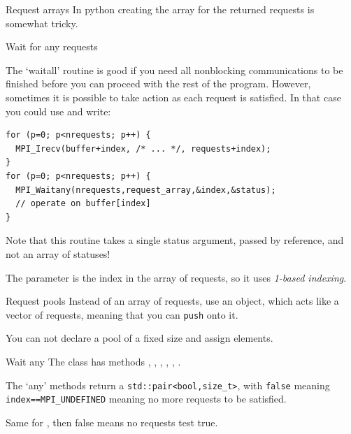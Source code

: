 \begin{pythonnote}{Request arrays}
  In python creating the array for the returned requests is somewhat
  tricky.
\end{pythonnote}

 {Wait for any requests}

The `waitall' routine is good if you need all nonblocking
communications to be finished before you can proceed with the rest of
the program. However, sometimes it is possible to take action as each
request is satisfied. In that case you could use
 and write:

\begin{lstlisting}
for (p=0; p<nrequests; p++) {
  MPI_Irecv(buffer+index, /* ... */, requests+index);
}
for (p=0; p<nrequests; p++) {
  MPI_Waitany(nrequests,request_array,&index,&status);
  // operate on buffer[index]
}
\end{lstlisting}

Note that this routine takes a single status argument, passed by
reference, and not an array of statuses!

\begin{fortrannote}
  The  parameter is the index in the array of requests,
  so it uses \emph{1-based indexing}.

\end{fortrannote}

\begin{mplnote}{Request pools}
  \label{mpl:req_pool}
  Instead of an array of requests,
  use an  object,
  which acts like a vector of requests,
  meaning that you can \lstinline+push+ onto it.


  You can not declare a pool of a fixed size and assign elements.
\end{mplnote}

\begin{mplnote}{Wait any}
  The  class has methods
  , ,
  , ,
  , .

  The `any' methods return a \lstinline+std::pair<bool,size_t>+,
  with \lstinline{false} meaning \lstinline+index==MPI_UNDEFINED+
  meaning no more requests to be satisfied.

  Same for , then false means no requests test true.
\end{mplnote}

